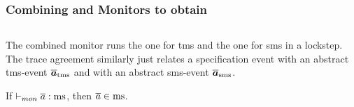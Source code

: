\documentclass[utf8,acmsmall,review,screen,dvipsnames,anonymous]{acmart}
\begin{document}
\subsubsection{Combining  and  Monitors to obtain }\label{subsubsec:ms}

\begin{center}
  $\;$\\
\end{center}
The combined monitor runs the one for \gls{tms} and the one for \gls{sms} in a lockstep. The trace agreement similarly just relates a specification event with an abstract \gls{tms}-event $\abstrace[_{\tmssafe}]$ and with an abstract \gls{sms}-event $\abstrace[_{\smssafe}]$.

\begin{lemma}\label{lem:mon:msafe}
  If $\monmssafe{\trace}$, then $\trace\in\mssafe$.\Coqed
\end{lemma}
\end{document}
